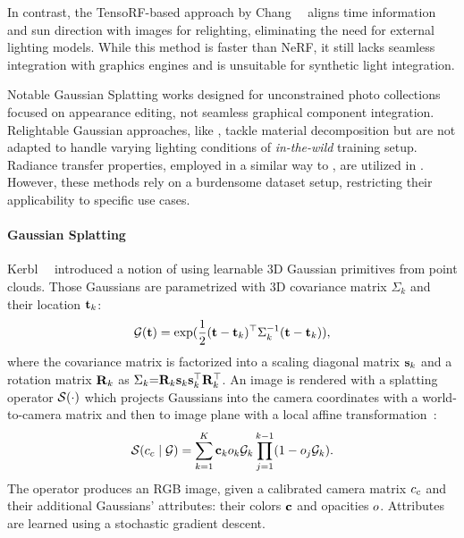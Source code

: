     In contrast, the TensoRF-based approach by
    Chang~\etal~\cite{chang2024srtensorf} aligns time information and sun
    direction with images for relighting, eliminating the need for external
    lighting models.
    While this method is faster than NeRF, it still lacks seamless integration
    with graphics engines and is unsuitable for synthetic light integration.

    Notable Gaussian Splatting works designed for unconstrained photo
    collections \cite{kerbl20233d, dahmani2024swagsplattingwildimages,
    zhang2024gaussian, xu2024wildgs, wang2024wegs} focused on appearance
    editing, not seamless graphical component integration.
    Relightable Gaussian approaches, like \cite{gao2023relightable,
    liang2024gs, shi2023gir}, tackle material decomposition but are not
    adapted to handle varying lighting conditions of \textit{in-the-wild}
    training setup.
    Radiance transfer properties, employed in a similar way to \lumigauss, are
    utilized in \cite{zhang2024prtgaussianefficientrelightingusing,
    saito2024relightable}.
    However, these methods rely on a burdensome dataset setup, restricting
    their applicability to specific use cases.

  \paragraph{Gaussian Splatting}
    Kerbl~\etal~\cite{kerbl20233d} introduced a notion of using learnable 3D
    Gaussian primitives from point clouds.
    Those Gaussians are parametrized with 3D covariance matrix $\Sigma_k$ and their location $\mathbf{t}_k$:
    \begin{equation}
      \mathcal{G}(\mathbf{t}) = \exp(\frac{1}{2}(\mathbf{t} - \mathbf{t}_k)^\top\Sigma_k^{-1}(\mathbf{t} - \mathbf{t}_k)),
    \end{equation}
    where the covariance matrix is factorized into a scaling diagonal matrix $\mathbf{s}_k$ and a rotation matrix $\mathbf{R}_k$ as $\Sigma_k{=}\mathbf{R}_k\mathbf{s}_k\mathbf{s}_k^\top\mathbf{R}_k^\top$. An image is rendered with a splatting operator $\mathcal{S}(\cdot)$ which projects Gaussians into the camera coordinates with a world-to-camera matrix and then to image plane with a local affine transformation~\cite{zwicker2001ewa}:
    \begin{equation}
      \label{eq:lumigauss-splatting-op}
      \mathcal{S}(c_c\;|\;\mathcal{G}) = \sum_{k=1}^K\mathbf{c}_ko_k\mathcal{G}_k\prod^{k-1}_{j=1}(1 - o_j \mathcal{G}_k).
    \end{equation}
    The operator produces an RGB image, given a calibrated camera matrix
    $c_c$ and their additional Gaussians' attributes: their colors
    $\mathbf{c}$ and opacities $o$.
    Attributes are learned using a stochastic gradient descent.

